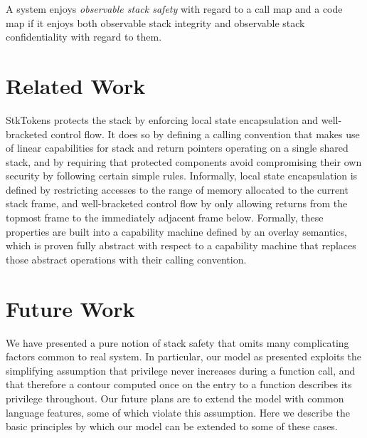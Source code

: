 \documentclass[acmsmall,review,anonymous]{acmart}\settopmatter{printfolios=true,printccs=false,printacmref=false}
\begin{document}
      A system enjoys {\em observable stack safety} with regard to a call map
      and a code map if it enjoys both observable stack integrity and
      observable stack confidentiality with regard to them.

\section{Related Work}
\label{sec:relwork}

StkTokens \citep{Skorstengaard+19} protects the stack by enforcing local state
encapsulation and well-bracketed control flow. It does so by defining a calling
convention that makes use of linear capabilities for stack and return pointers
operating on a single shared stack, and by requiring that protected components
avoid compromising their own security by following certain simple rules.
Informally, local state encapsulation is defined by restricting accesses to the
range of memory allocated to the current stack frame, and well-bracketed control
flow by only allowing returns from the topmost frame to the immediately adjacent
frame below. Formally, these properties are built into a capability machine
defined by an overlay semantics, which is proven fully abstract with respect to
a capability machine that replaces those abstract operations with their calling
convention.


\section{Future Work}
  \label{sec:future}

  We have presented a pure notion of stack safety that omits many complicating
  factors common to real system. In particular, our model as presented exploits
  the simplifying assumption that privilege never increases during a function
  call, and that therefore a contour computed once on the entry to a function
  describes its privilege throughout. Our future plans are to extend the model
  with common language features, some of which violate this assumption. Here we
  describe the basic principles by which our model can be extended to some of
  these cases.
\end{document}
